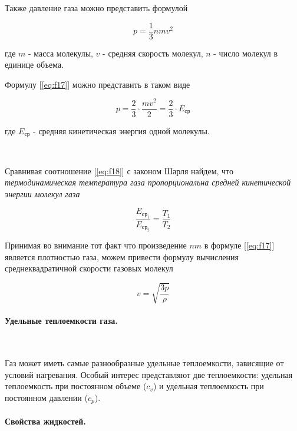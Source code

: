 \documentclass[a4paper,12pt]{article}
\begin{document}
		Также давление газа можно представить формулой

		\begin{equation}
			p = \frac{1}{3} nmv^2
			\label{eq:f17}
		\end{equation}

		где $m$ - масса молекулы, $v$ - средняя скорость молекул, $n$ - число молекул в 
		единице объема.

		Формулу [\ref{eq:f17}] можно представить в таком виде

		\begin{equation}
			p = \frac{2}{3} \cdot \frac{mv^2}{2} = \frac{2}{3} \cdot E_{\text{ср}}
			\label{eq:f18}
		\end{equation}

		где $E_{\text{ср}}$ - средняя кинетическая энергия одной молекулы.

		\

		Сравнивая соотношение [\ref{eq:f18}] с законом Шарля найдем, что \textit{
		термодинамическая температура газа пропорциональна средней кинетической энергии молекул газа}

		\begin{equation}
			\frac{E_{\text{ср}_1}}{E_{\text{ср}_2}} = \frac{T_1}{T_2}
		\end{equation}

		Принимая во внимание тот факт что произведение $nm$ в формуле [\ref{eq:f17}] 
		является плотностью газа, можем привести формулу вычисления среднеквадратичной 
		скорости газовых молекул

		\begin{equation}
			v = \sqrt{\frac{3p}{\rho}}
		\end{equation}

		\paragraph{Удельные теплоемкости газа.} \

		Газ может иметь самые разнообразные удельные теплоемкости, зависящие от условий 
		нагревания. Особый интерес представляют две теплоемкости: удельная теплоемкость
		при постоянном объеме ($c_v$) и удельная теплоемкость при постоянном давлении 
		($c_p$).

		\clearpage

		\paragraph{Свойства жидкостей.} \
\end{document}
